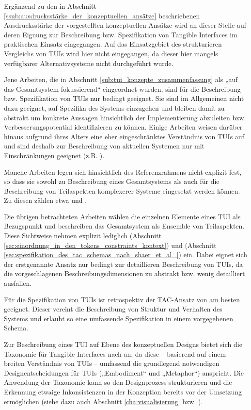 Ergänzend zu den in Abschnitt \ref{ssub:ausdrucksstärke_der_konzeptuellen_ansätze} beschriebenen Ausdrucksstärke der vorgestellten konzeptuellen Ansätze wird an dieser Stelle auf deren Eignung zur Beschreibung bzw. Spezifikation von Tangible Interfaces im praktischen Einsatz eingegangen. Auf das Einsatzgebiet des strukturieren Vergleichs von \glspl{TUI} wird hier nicht eingegangen, da dieser hier mangels verfügbarer Alternativsysteme nicht durchgeführt wurde.

Jene Arbeiten, die in Abschnitt \ref{sub:tui_konzepte_zusammenfassung} als „auf das Gesamtsystem fokussierend“ eingeordnet wurden, sind für die Beschreibung bzw. Spezifikation von \glspl{TUI} nur bedingt geeignet. Sie sind im Allgemeinen nicht dazu geeignet, auf Spezifika des Systems einzugehen und bleiben damit zu abstrakt um konkrete Aussagen hinsichtlich der Implementierung abzuleiten bzw. Verbesserungspotential identifizieren zu können. Einige Arbeiten weisen darüber hinaus aufgrund ihres Alters eine eher eingeschränktes Verständnis von \glspl{TUI} auf und sind deshalb zur Beschreibung von aktuellen Systemen nur mit Einschränkungen geeignet (z.B. \citep{Fitzmaurice96}).

Manche Arbeiten legen sich hinsichtlich des Referenzrahmens nicht explizit fest, so dass sie sowohl zu Beschreibung eines Gesamtsystems als auch für die Beschreibung von Teilaspekten komplexerer Systeme eingesetzt werden können. Zu diesen zählen etwa \citep{Koleva03} und \citet{Fishkin04}.

Die übrigen betrachteten Arbeiten wählen die einzelnen Elemente eines \gls{TUI} als Bezugspunkt und beschreiben das Gesamtsystem als Ensemble von Teilaspekten. Diese Sichtweise nehmen explizit lediglich \citep{Ullmer05} (Abschnitt \ref{sec:einordnung_in_den_tokens_constraints_kontext}) und \citep{Shaer04} (Abschnitt \ref{sec:spezifikation_des_tac_schemas_nach_shaer_et_al_}) ein. Dabei eignet sich der erstgenannte Ansatz nur bedingt zur detaillieren Beschreibung von \glspl{TUI}, da die vorgeschlagenen Beschreibungsdimensionen zu abstrakt bzw. wenig detailliert ausfallen.

Für die Spezifikation von \glspl{TUI} ist retrospektiv der TAC-Ansatz von \citet{Shaer04} am besten geeignet. Dieser vereint die Beschreibung von Struktur und Verhalten des Systems und erlaubt so eine umfassende Spezifikation in einem vorgegebenen Schema. 

Zur Beschreibung eines \gls{TUI} auf Ebene des konzeptuellen Designs bietet sich die Taxonomie für Tangible Interfaces nach \citet{Fishkin04} an, da diese -- basierend auf einem breiten Verständnis von \glspl{TUI} -- umfassend die grundlegend notwendigen Designentscheidungen für \glspl{TUI} („Embodiment“ und „Metaphor“) anspricht. Die Anwendung der Taxonomie kann so den Designprozess strukturieren und die Erkennung etwaige Inkonsistenzen in der Konzeption bereits vor der Umsetzung ermöglichen (siehe dazu auch Abschnitt \ref{cha:visualisierung} bzw. \citep{Oppl09d}). 

